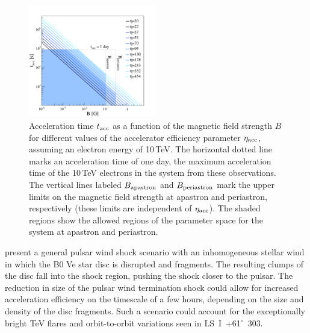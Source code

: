 \documentclass[preprint2]{aastex}
\newcommand{\lsi}{LS~I~+61$^{\circ}$~303}
\newcommand{\tev}{\,TeV}
\begin{document}
\begin{figure}[ht]
\centering
\includegraphics[width=0.5\textwidth]{figs/taccvsB_areas.pdf}
\caption{Acceleration time $t_{\mbox{\scriptsize{acc}}}$ as a function of the magnetic field strength $B$ for different values of the accelerator efficiency parameter $\eta_{\mbox{\scriptsize{acc}}}$, assuming an electron energy of 10\tev{}. The horizontal dotted line marks an acceleration time of one day, the maximum acceleration time of the 10\tev{} electrons in the system from these observations. The vertical lines labeled $B_{\mbox{\scriptsize{apastron}}}$ and $B_{\mbox{\scriptsize{periastron}}}$ mark the upper limits on the magnetic field strength at apastron and periastron, respectively (these limits are independent of $\eta_{\mbox{\scriptsize{acc}}}$). The shaded regions show the allowed regions of the parameter space for the system at apastron and periastron.}
\label{f:tacc}
\end{figure}


\citet{Paredes-Fortuny2014} present a general pulsar wind shock scenario with an inhomogeneous stellar wind in which the B0 Ve star disc is disrupted and fragments. The resulting clumps of the disc fall into the shock region, pushing the shock closer to the pulsar. The reduction in size of the pulsar wind termination shock could allow for increased acceleration efficiency on the timescale of a few hours, depending on the size and density of the disc fragments. Such a scenario could account for the exceptionally bright TeV flares and orbit-to-orbit variations seen in \lsi{}.
\vspace{2ex}
\end{document}

